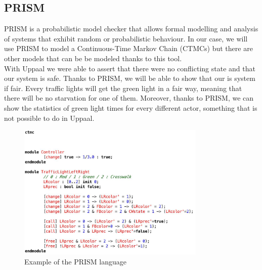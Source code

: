  \subsection{PRISM}
 PRISM is a probabilistic model checker that allows formal modelling and analysis of systems that exhibit random or probabilistic behaviour. In our case, we will use PRISM to model a Continuous-Time Markov Chain (CTMCs) but there are other models that can be be modeled thanks to this tool. \\
 With Uppaal we were able to assert that there were no conflicting state and that our system is safe. Thanks to PRISM, we will be able to show that our is system if fair. Every traffic lights will get the green light in a fair way, meaning that there will be no starvation for one of them. Moreover, thanks to PRISM, we can show the statistics of green light times for every different actor, something that is not possible to do in Uppaal.
 
\begin{figure}[h]\label{fig:prism}
  \begin{center}
    \includegraphics[width=0.8\textwidth]{picture/prism.png}
    \caption{Example of the PRISM language}
  \end{center}
\end{figure} 


